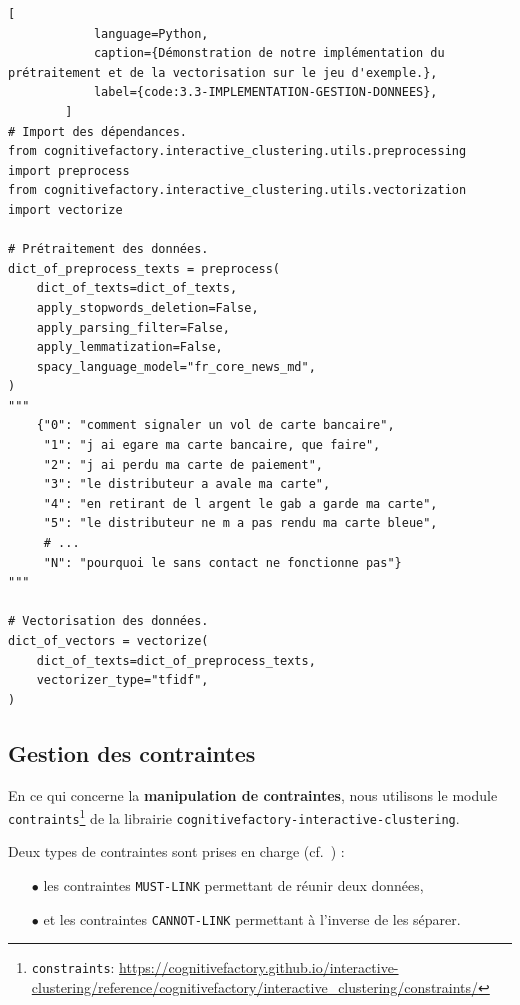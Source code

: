 		\begin{lstlisting}[
			language=Python,
			caption={Démonstration de notre implémentation du prétraitement et de la vectorisation sur le jeu d'exemple.},
			label={code:3.3-IMPLEMENTATION-GESTION-DONNEES},
		]
# Import des dépendances.
from cognitivefactory.interactive_clustering.utils.preprocessing import preprocess
from cognitivefactory.interactive_clustering.utils.vectorization import vectorize

# Prétraitement des données.
dict_of_preprocess_texts = preprocess(
	dict_of_texts=dict_of_texts,
	apply_stopwords_deletion=False,
	apply_parsing_filter=False,
	apply_lemmatization=False,
	spacy_language_model="fr_core_news_md",
)
"""
	{"0": "comment signaler un vol de carte bancaire",
	 "1": "j ai egare ma carte bancaire, que faire",
	 "2": "j ai perdu ma carte de paiement",
	 "3": "le distributeur a avale ma carte",
	 "4": "en retirant de l argent le gab a garde ma carte",
	 "5": "le distributeur ne m a pas rendu ma carte bleue",
	 # ...
	 "N": "pourquoi le sans contact ne fonctionne pas"}
"""

# Vectorisation des données.
dict_of_vectors = vectorize(
	dict_of_texts=dict_of_preprocess_texts,
	vectorizer_type="tfidf",
)
		\end{lstlisting}
		
		\subsection{Gestion des contraintes}
		\label{section:3.3.2-GESTION-DES-CONTRAINTES}
		
		En ce qui concerne la \textbf{manipulation de contraintes}, nous utilisons le module \texttt{contraints}\footnote{
			\texttt{constraints}: \url{https://cognitivefactory.github.io/interactive-clustering/reference/cognitivefactory/interactive_clustering/constraints/}
		} de la librairie \texttt{cognitivefactory-interactive-clustering}.
		
		Deux types de contraintes sont prises en charge (cf.~\cite{wagstaff-cardie:2000:clustering-instancelevel-constraints}) :
		\begin{itemize}
			\item[\(\bullet\)] les contraintes \texttt{MUST-LINK} permettant de réunir deux données,
			\item[\(\bullet\)] et les contraintes \texttt{CANNOT-LINK} permettant à l'inverse de les séparer.
		\end{itemize}

